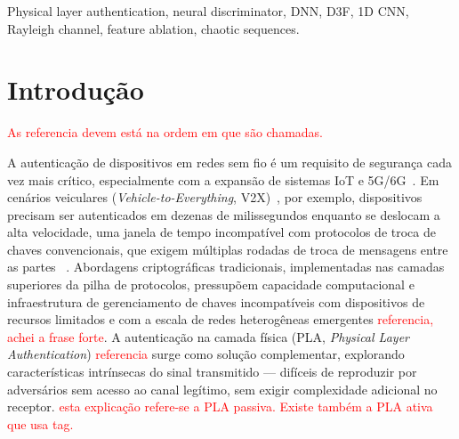 \documentclass{sbrt}
\newcommand{\rred}[1]{\textcolor{red}{#1}}
\begin{document}
\begin{abstract}
This paper proposes the application of a neural network discriminator to the problem of physical layer authentication with chaotic authentication sequences (tags) over Rayleigh fading channels. We investigate three input representations for the discriminator's decision-making: (i) a four-feature physically motivated vector, (ii) a 1D CNN over the equalized received signal after legitimate tag extraction ($\mathbf{z}_{eq}$), and (iii) a DNN over $\mathbf{z}_{eq}$.
A systematic ablation study yields the central result: only two scalars per packet — the matched correlator output $|\tau|$ and the received energy $E$ — are necessary and sufficient to outperform the classical correlator, achieving $P_D = 87{,}2\%$ at 0~dB versus $8{,}1\%$ for the analytical method. In contrast, $\mathbf{z}_{eq}$-based approaches fail at low SNR because coherent integration cannot be performed without explicit access to the reference tag.

\end{abstract}
\begin{keywords}
Physical layer authentication, neural discriminator, DNN, D3F, 1D CNN, Rayleigh channel, feature ablation, chaotic sequences.
\end{keywords}

\section{Introdução}

\rred{As referencia devem está na ordem em que são chamadas.}

A autenticação de dispositivos em redes sem fio é um requisito de segurança cada vez mais crítico, especialmente com a expansão de sistemas IoT e 5G/6G~\cite{ref_xie}. Em cenários veiculares (\textit{Vehicle-to-Everything}, V2X)~\cite{ref_3gpp}, por exemplo, dispositivos precisam ser autenticados em dezenas de milissegundos enquanto se deslocam a alta velocidade, uma janela de tempo incompatível com protocolos de troca de chaves convencionais, que exigem múltiplas rodadas de troca de mensagens entre as partes ~\cite{ref_raya}. Abordagens criptográficas tradicionais, implementadas nas camadas superiores da pilha de protocolos, pressupõem capacidade computacional e infraestrutura de gerenciamento de chaves incompatíveis com dispositivos de recursos limitados e com a escala de redes heterogêneas emergentes \rred{referencia, achei a frase forte}. A autenticação na camada física (PLA, \textit{Physical Layer Authentication}) \rred{referencia} surge como solução complementar, explorando características intrínsecas do sinal transmitido — difíceis de reproduzir por adversários sem acesso ao canal legítimo, sem exigir complexidade adicional no receptor. \rred{esta explicação refere-se a PLA passiva. Existe também a PLA ativa que usa tag. }
\end{document}
